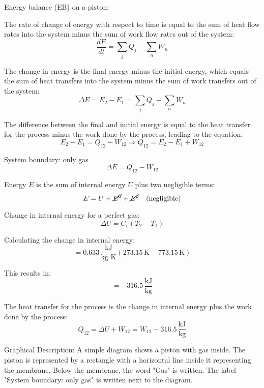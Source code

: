 Energy balance (EB) on a piston:

The rate of change of energy with respect to time is equal to the sum of heat flow rates into the system minus the sum of work flow rates out of the system:
\[
\frac{dE}{dt} = \sum_j \dot{Q}_j - \sum_n \dot{W}_n
\]

The change in energy is the final energy minus the initial energy, which equals the sum of heat transfers into the system minus the sum of work transfers out of the system:
\[
\Delta E = E_2 - E_1 = \sum_j Q_j - \sum_n W_n
\]

The difference between the final and initial energy is equal to the heat transfer for the process minus the work done by the process, leading to the equation:
\[
E_2 - E_1 = Q_{12} - W_{12} \Rightarrow Q_{12} = E_2 - E_1 + W_{12}
\]

System boundary: only gas
\[
\Delta E = Q_{12} - W_{12}
\]

Energy \(E\) is the sum of internal energy \(U\) plus two negligible terms:
\[
E = U + \cancel{E^0} + \cancel{E^0} \quad \text{(negligible)}
\]

Change in internal energy for a perfect gas:
\[
\Delta U = C_v (T_2 - T_1)
\]

Calculating the change in internal energy:
\[
= 0.633 \, \frac{\text{kJ}}{\text{kg K}} (273.15 \, \text{K} - 773.15 \, \text{K})
\]

This results in:
\[
= -316.5 \, \frac{\text{kJ}}{\text{kg}}
\]

The heat transfer for the process is the change in internal energy plus the work done by the process:
\[
Q_{12} = \Delta U + W_{12} = W_{12} - 316.5 \, \frac{\text{kJ}}{\text{kg}}
\]

Graphical Description:
A simple diagram shows a piston with gas inside. The piston is represented by a rectangle with a horizontal line inside it representing the membrane. Below the membrane, the word "Gas" is written. The label "System boundary: only gas" is written next to the diagram.